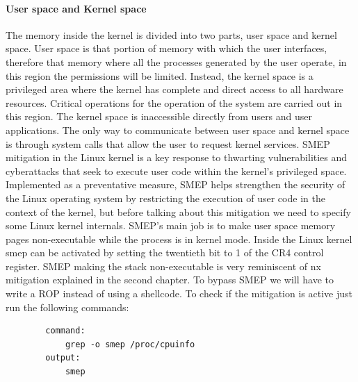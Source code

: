 \documentclass{report}
\begin{document}
    \paragraph{User space and Kernel space}
    The memory inside the kernel is divided into two parts, user space and kernel space.\newline
    User space is that portion of memory with which the user interfaces, therefore that memory where all the processes generated by the user operate, in this region the permissions will be limited.\newline
    Instead, the kernel space is a privileged area where the kernel has complete and direct access to all hardware resources.\newline
    Critical operations for the operation of the system are carried out in this region.\newline
    The kernel space is inaccessible directly from users and user applications.\newline
    The only way to communicate between user space and kernel space is through system calls that allow the user to request kernel services.\newline
   SMEP mitigation in the Linux kernel is a key response to thwarting vulnerabilities and cyberattacks that seek to execute user code within the kernel's privileged space. Implemented as a preventative measure, SMEP helps strengthen the security of the Linux operating system by restricting the execution of user code in the context of the kernel, but before talking about this mitigation we need to specify some Linux kernel internals.\newline
    SMEP's main job is to make user space memory pages non-executable while the process is in kernel mode. Inside the Linux kernel smep can be activated by setting the twentieth bit to 1 of the CR4 control register.\newline
    SMEP making the stack non-executable is very reminiscent of nx mitigation explained in the second chapter.\newline
    To bypass SMEP we will have to write a ROP instead of using a shellcode.\newline 
    To check if the mitigation is active just run the following commands: \newline
        \begin{verbatim}
        command:
            grep -o smep /proc/cpuinfo
        output: 
            smep
    \end{verbatim}
    
\end{document}
